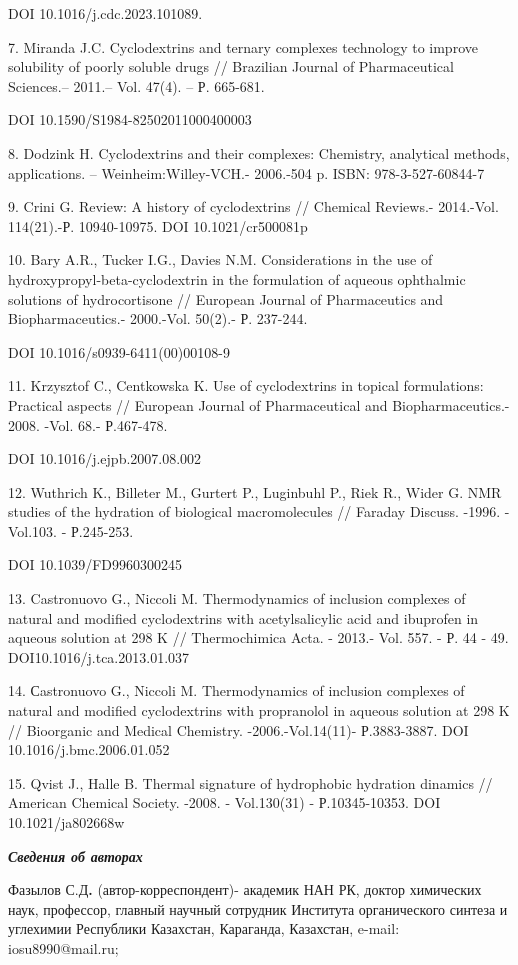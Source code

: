 DOI 10.1016/j.cdc.2023.101089.

7. Miranda J.C. Cyclodextrins and ternary complexes technology to
improve solubility of poorly soluble drugs // Brazilian Journal of
Pharmaceutical Sciences.-- 2011.-- Vol. 47(4). -- Р. 665-681.

DOI 10.1590/S1984-82502011000400003

8. Dodzink H. Cyclodextrins and their complexes: Chemistry, analytical
methods, applications. -- Weinheim:Willey-VCH.- 2006.-504 p. ISBN:
978-3-527-60844-7

9. Crini G. Review: A history of cyclodextrins // Chemical Reviews.-
2014.-Vol. 114(21).-Р. 10940-10975. DOI 10.1021/cr500081p

10. Bary A.R., Tucker I.G., Davies N.M. Considerations in the use of
hydroxypropyl-beta-cyclodextrin in the formulation of aqueous ophthalmic
solutions of hydrocortisone // European Journal of Pharmaceutics and
Biopharmaceutics.- 2000.-Vol. 50(2).- Р. 237-244.

DOI 10.1016/s0939-6411(00)00108-9

11. Krzysztof C., Centkowska K. Use of cyclodextrins in topical
formulations: Practical aspects // European Journal of Pharmaceutical
and Biopharmaceutics.- 2008. -Vol. 68.- Р.467-478.

DOI 10.1016/j.ejpb.2007.08.002

12. Wuthrich K., Billeter M., Gurtert P., Luginbuhl P., Riek R., Wider
G. NMR studies of the hydration of biological macromolecules // Faraday
Discuss. -1996. - Vol.103. - Р.245-253.

DOI 10.1039/FD9960300245

13. Castronuovo G., Niccoli M. Thermodynamics of inclusion complexes of
natural and modified cyclodextrins with acetylsalicylic acid and
ibuprofen in aqueous solution at 298 K // Thermochimica Acta. - 2013.-
Vol. 557. - Р. 44 - 49. DOI10.1016/j.tca.2013.01.037

14. Сastronuovo G., Niccoli M. Thermodynamics of inclusion complexes of
natural and modified cyclodextrins with propranolol in aqueous solution
at 298 K // Bioorganic and Medical Chemistry. -2006.-Vol.14(11)-
Р.3883-3887. DOI 10.1016/j.bmc.2006.01.052~

15. Qvist J., Halle B. Thermal signature of hydrophobic hydration
dinamics // American Chemical Society. -2008. - Vol.130(31) -
Р.10345-10353. DOI 10.1021/ja802668w

\emph{{\bfseries Сведения об авторах}}

Фазылов С.Д{\bfseries .} (автор-корреспондент)- академик НАН РК, доктор
химических наук, профессор, главный научный сотрудник Института
органического синтеза и углехимии Республики Казахстан, Караганда,
Казахстан, e-mail: iosu8990@mail.ru;

